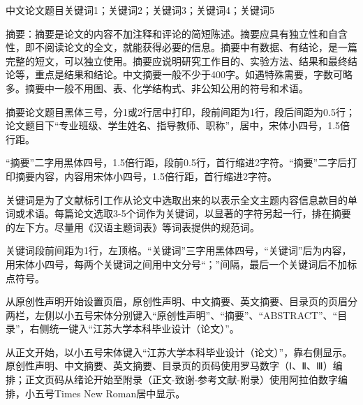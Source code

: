 %
%

\begin{cnabstract}{中文论文题目}{关键词1；关键词2；关键词3；关键词4；关键词5}

{\heiti{}摘要}：摘要是论文的内容不加注释和评论的简短陈述。摘要应具有独立性和自含性，即不阅读论文的全文，就能获得必要的信息。摘要中有数据、有结论，是一篇完整的短文，可以独立使用。摘要应说明研究工作目的、实验方法、结果和最终结论等，重点是结果和结论。中文摘要一般不少于400字。如遇特殊需要，字数可略多。摘要中一般不用图、表、化学结构式、非公知公用的符号和术语。

摘要论文题目黑体三号，分1或2行居中打印，段前间距为1行，段后间距为0.5行；论文题目下“专业班级、学生姓名、指导教师、职称”，居中，宋体小四号，1.5倍行距。

“摘要”二字用黑体四号，1.5倍行距，段前0.5行，首行缩进2字符。“摘要”二字后打印摘要内容，内容用宋体小四号，1.5倍行距，首行缩进2字符。

关键词是为了文献标引工作从论文中选取出来的以表示全文主题内容信息款目的单词或术语。每篇论文选取3-5个词作为关键词，以显著的字符另起一行，排在摘要的左下方。尽量用《汉语主题词表》等词表提供的规范词。

关键词段前间距为1行，左顶格。“关键词”三字用黑体四号，“关键词”后为内容，用宋体小四号，每两个关键词之间用中文分号“；”间隔，最后一个关键词后不加标点符号。

从原创性声明开始设置页眉，原创性声明、中文摘要、英文摘要、目录页的页眉分两栏，左侧以小五号宋体分别键入“原创性声明”、“摘要”、“ABSTRACT”、“目录”，右侧统一键入“江苏大学本科毕业设计（论文）”。

从正文开始，以小五号宋体键入“江苏大学本科毕业设计（论文）”，靠右侧显示。原创性声明、中文摘要、英文摘要、目录页的页码使用罗马数字（Ⅰ、Ⅱ、Ⅲ）编排；正文页码从绪论开始至附录（正文-致谢-参考文献-附录）使用阿拉伯数字编排，小五号Times New Roman居中显示。

\end{cnabstract}
